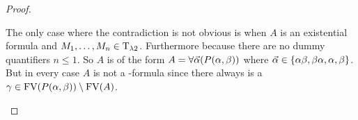 \begin{proof}
\begin{itemize}
		The only case where the contradiction is not obvious is when $A$ is an existential formula and $M_1,\dots,M_n\in\text{T}_{\lambda2}$. Furthermore because there are no dummy quantifiers $n\leq1$. So $A$ is of the form $A=\forall\predVec(P(\predFst,\predSnd))$ where $\predVec\in\{\predFst\predSnd,\predSnd\predFst,\predFst,\predSnd\}$.
		But in every case $A$ is not a \SysP-formula since there always is a $\gamma\in\FV(P(\predFst,\predSnd))\setminus\FV(A)$.
		
\end{itemize}
\end{proof}

